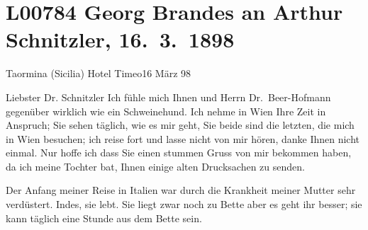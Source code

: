

\section[Georg Brandes an Arthur Schnitzler, 16. 3. 1898]{L00784 Georg Brandes an Arthur Schnitzler, 16. 3. 1898}
\nopagebreak{}
\rehead{ }\normalsize\beginnumbering{}
\toendnotes[C]{\smallbreak\pagebreak[2]}
\toendnotes[C]{\smallbreak}
\pstart
           \raggedleft{}{\pb}Taormina (Sicilia) Hotel Timeo16 März 98\pend
           
\pstart\center{}Liebster Dr. Schnitzler\pend\vspace{0.5em}
\pstart
           Ich fühle mich Ihnen und Herrn Dr. Beer-Hofmann gegenüber wirklich wie ein Schweinehund. Ich nehme in Wien Ihre Zeit in Anspruch; Sie sehen täglich, wie
               es mir geht, Sie beide sind die letzten, die mich in Wien besuchen; ich reise fort und lasse nicht von mir hören, danke Ihnen
               nicht einmal. Nur hoffe ich dass Sie einen stummen Gruss von mir bekommen haben, da
               ich meine Tochter bat, Ihnen
               einige alten Drucksachen zu senden.\pend
           
\pstart
           Der Anfang meiner Reise in Italien war durch
               die Krankheit meiner Mutter
               sehr {\pb}verdüstert. Indes, sie lebt.
               Sie liegt zwar noch zu Bette aber es geht ihr besser; sie kann täglich eine Stunde
               aus dem Bette sein.\pend
           
